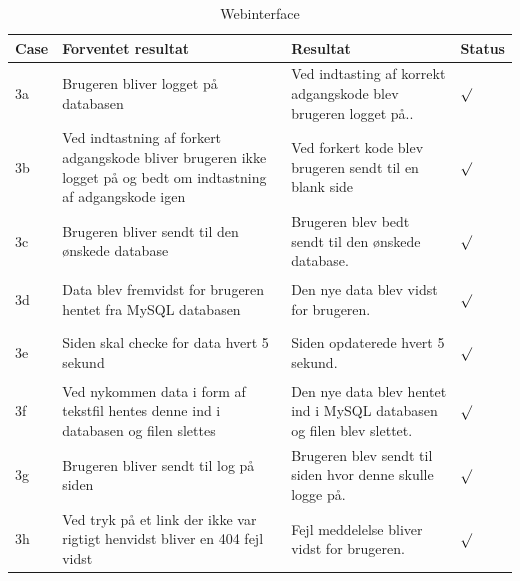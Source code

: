 \begin{table}[H]
\caption{Webinterface}
\centering
\begin{tabular}{| p{1cm}  | p{6cm} | p{5cm} | p{1cm} |}
\hline
Case &Forventet resultat &Resultat &Status\\\hline
3a &Brugeren bliver logget på databasen  & Ved indtasting af korrekt adgangskode blev brugeren logget på.. &\begin{Huge}$\surd$\end{Huge} \\\hline 
3b &Ved indtastning af forkert adgangskode bliver brugeren ikke logget på og bedt om indtastning af adgangskode igen   & Ved forkert kode blev brugeren sendt til en blank side &\begin{Huge}$\surd$\end{Huge} \\\hline
3c &Brugeren bliver sendt til den ønskede database  & Brugeren blev bedt sendt til den ønskede database. &\begin{Huge}$\surd$\end{Huge} \\\hline
3d &Data blev fremvidst for brugeren hentet fra MySQL databasen & Den nye data blev vidst for brugeren. &\begin{Huge}$\surd$\end{Huge} \\\hline
3e &Siden skal checke for data hvert 5 sekund & Siden opdaterede hvert 5 sekund. &\begin{Huge}$\surd$\end{Huge} \\\hline
3f &Ved nykommen data i form af tekstfil hentes denne ind i databasen og filen slettes & Den nye data blev hentet ind i MySQL databasen og filen blev slettet. &\begin{Huge}$\surd$\end{Huge} \\\hline
3g &Brugeren bliver sendt til log på siden & Brugeren blev sendt til siden hvor denne skulle logge på. &\begin{Huge}$\surd$\end{Huge} \\\hline
3h &Ved tryk på et link der ikke var rigtigt henvidst bliver en 404 fejl vidst & Fejl meddelelse bliver vidst for brugeren. &\begin{Huge}$\surd$\end{Huge} \\\hline
\end{tabular}
\end{table}

